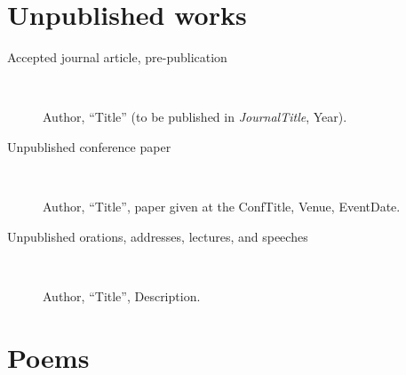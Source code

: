 \documentclass[extrafontsizes,11pt,a4paper,oneside]{memoir}
\newcommand*{\lit}[1]{\textsf{#1}}
\begin{document}
    
    \section{Unpublished works}\label{sec:unpublished}
    
    \begin{description}
        \item[Accepted journal article, pre-publication]~\par
        Author, \enquote{Title} (\lit{to be published in} \emph{JournalTitle}, Year).
        
        \item[Unpublished conference paper]~\par
        Author, \enquote{Title}, \lit{paper given at the} ConfTitle, Venue, EventDate.
        \\
        
        \item[Unpublished orations, addresses, lectures, and speeches]~\par Author, \enquote{Title}, Description.
    \end{description}
    
    
    \section{Poems}\label{sec:poem}
    
\end{document}
